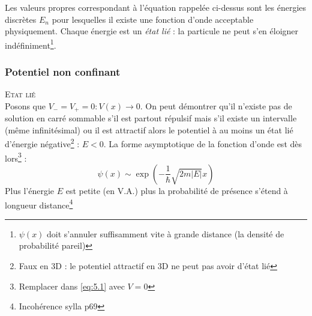\documentclass	[11pt, a4paper, openany]{book}
\begin{document}
	Les valeurs propres correspondant à l'équation rappelée ci-dessus sont les énergies discrètes $E_n$ pour lesquelles il existe une fonction d'onde acceptable physiquement. Chaque énergie est un \textit{état lié} : la particule ne peut s'en éloigner indéfiniment\footnote{$\psi(x)$ doit s'annuler suffisamment vite à grande distance (la densité de probabilité pareil)}.
	
	\subsubsection*{Potentiel non confinant}
	\textsc{Etat lié}\\
	Posons que $V_- = V_+ = 0 : V(x) \rightarrow 0$. On peut démontrer qu'il n'existe pas de solution en carré sommable s'il est partout répulsif mais s'il existe un intervalle (même infinitésimal) ou il est attractif alors le potentiel à au moins un état lié d'énergie négative\footnote{Faux en 3D : le potentiel attractif en 3D ne peut pas avoir d'état lié} : $E <0$. La forme asymptotique de la fonction d'onde est dès lors\footnote{Remplacer dans \eqref{eq:5.1} avec $V=0$} :
	\begin{equation}
		\psi(x) \sim \exp\left(-\frac{1}{\hbar}\sqrt{2m|E|}x\right)
	\end{equation}
	Plus l'énergie $E$ est petite (en V.A.) plus la probabilité de présence s'étend à longueur distance\footnote{Incohérence sylla p69}\\
	
\end{document}
